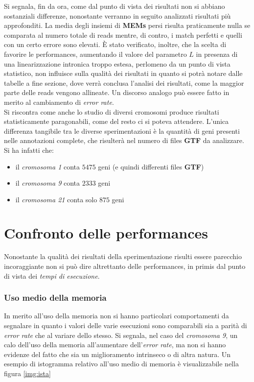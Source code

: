 \documentclass[a4paper,12pt, oneside]{book}
\begin{document}
Si segnala, fin da ora, come dal punto di vista dei risultati non si abbiano
sostanziali differenze, nonostante verranno in seguito analizzati risultati più
approfonditi. La media degli insiemi di \textbf{MEMs} persi risulta 
praticamente nulla se comparata al numero totale di reads mentre, di contro, i
match perfetti e quelli con un certo errore sono elevati. È stato verificato,
inoltre, che la scelta di favorire le performances, aumentando il valore del
parametro $L$ in presenza di una linearizzazione intronica troppo estesa,
perlomeno da un punto di vista statistico, non influisce sulla qualità dei
risultati in quanto si potrà notare dalle tabelle a fine sezione, dove verrà
conclusa l'analisi dei risultati, come la maggior parte delle
reads vengono allineate. Un discorso analogo può essere fatto in merito al
cambiamento di \textit{error rate}.\\
Si riscontra come anche lo studio di diversi cromosomi produce risultati
statisticamente paragonabili, come del resto ci si poteva attendere.
L'unica differenza tangibile tra le diverse sperimentazioni è la quantità di
geni presenti nelle annotazioni complete, che risulterà nel numero di files
\textbf{GTF} da analizzare. Si ha infatti che: 
\begin{itemize}
  \item il \textit{cromosoma 1} conta $5475$ geni (e quindi differenti files
  \textbf{GTF})
  \item il \textit{cromosoma 9} conta $2333$ geni
  \item il \textit{cromosoma 21} conta solo $875$ geni 
\end{itemize}
\section{Confronto delle performances}
Nonostante la qualità dei risultati della sperimentazione risulti essere
parecchio incoraggiante non si può dire altrettanto delle performances, in
primis dal punto di vista dei \textit{tempi di esecuzione}.
\subsubsection{Uso medio della memoria}
In merito all'uso della memoria non si hanno particolari comportamenti da
segnalare in 
quanto i valori delle varie esecuzioni sono comparabili sia a parità di
\textit{error rate} che al variare dello stesso. Si segnala, nel caso del
\textit{cromosoma 9}, un calo dell'uso della memoria all'aumentare
dell'\textit{error rate}, ma non si hanno evidenze del fatto che sia un
miglioramento intrinseco o di altra natura. Un esempio di istogramma
relativo all'uso medio di memoria è visualizzabile nella figura
\ref{img:ista}
\end{document}
